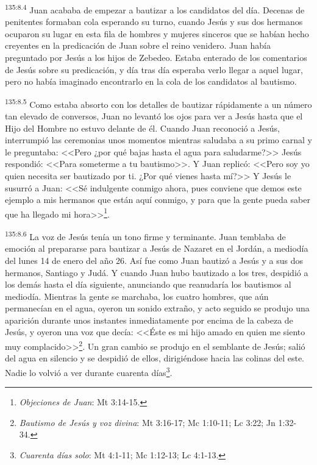 \par 
\textsuperscript{135:8.4} Juan acababa de empezar a bautizar a los candidatos del día. Decenas de penitentes formaban cola esperando su turno, cuando Jesús y sus dos hermanos ocuparon su lugar en esta fila de hombres y mujeres sinceros que se habían hecho creyentes en la predicación de Juan sobre el reino venidero. Juan había preguntado por Jesús a los hijos de Zebedeo. Estaba enterado de los comentarios de Jesús sobre su predicación, y día tras día esperaba verlo llegar a aquel lugar, pero no había imaginado encontrarlo en la cola de los candidatos al bautismo.

\par 
\textsuperscript{135:8.5} Como estaba absorto con los detalles de bautizar rápidamente a un número tan elevado de conversos, Juan no levantó los ojos para ver a Jesús hasta que el Hijo del Hombre no estuvo delante de él. Cuando Juan reconoció a Jesús, interrumpió las ceremonias unos momentos mientras saludaba a su primo carnal y le preguntaba: <<Pero ¿por qué bajas hasta el agua para saludarme?>> Jesús respondió: <<Para someterme a tu bautismo>>. Y Juan replicó: <<Pero soy yo quien necesita ser bautizado por ti. ¿Por qué vienes hasta mí?>> Y Jesús le susurró a Juan: <<Sé indulgente conmigo ahora, pues conviene que demos este ejemplo a mis hermanos que están aquí conmigo, y para que la gente pueda saber que ha llegado mi hora>>\footnote{\textit{Objeciones de Juan}: Mt 3:14-15.}.

\par 
\textsuperscript{135:8.6} La voz de Jesús tenía un tono firme y terminante. Juan temblaba de emoción al prepararse para bautizar a Jesús de Nazaret en el Jordán, a mediodía del lunes 14 de enero del año 26. Así fue como Juan bautizó a Jesús y a sus dos hermanos, Santiago y Judá. Y cuando Juan hubo bautizado a los tres, despidió a los demás hasta el día siguiente, anunciando que reanudaría los bautismos al mediodía. Mientras la gente se marchaba, los cuatro hombres, que aún permanecían en el agua, oyeron un sonido extraño, y acto seguido se produjo una aparición durante unos instantes inmediatamente por encima de la cabeza de Jesús, y oyeron una voz que decía: <<Éste es mi hijo amado en quien me siento muy complacido>>\footnote{\textit{Bautismo de Jesús y voz divina}: Mt 3:16-17; Mc 1:10-11; Lc 3:22; Jn 1:32-34.}. Un gran cambio se produjo en el semblante de Jesús; salió del agua en silencio y se despidió de ellos, dirigiéndose hacia las colinas del este. Nadie lo volvió a ver durante cuarenta días\footnote{\textit{Cuarenta días solo}: Mt 4:1-11; Mc 1:12-13; Lc 4:1-13.}.

